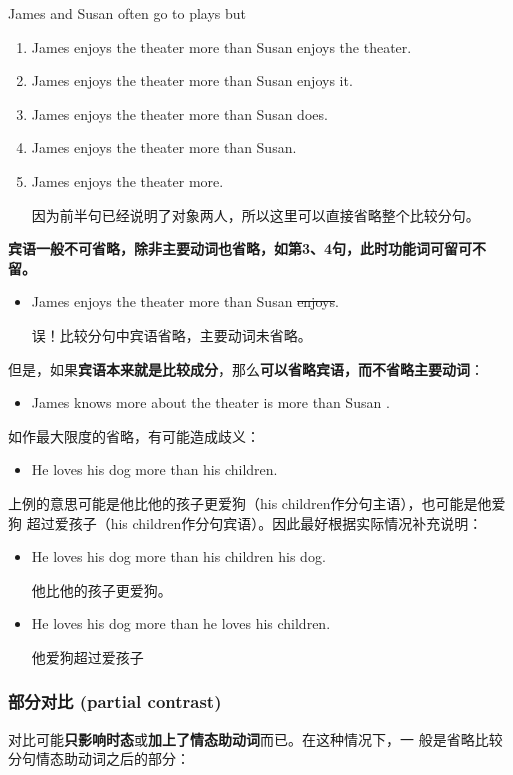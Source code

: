 James and Susan often go to plays but
\begin{enumerate}
\item James enjoys the theater more than Susan enjoys the theater.
\item James enjoys the theater more than Susan enjoys it.
\item James enjoys the theater more than Susan does.
\item James enjoys the theater more than Susan.
\item James enjoys the theater more.

  因为前半句已经说明了对象两人，所以这里可以直接省略整个比较分句。
\end{enumerate}
\textbf{宾语一般不可省略，除非主要动词也省略，如第3、4句，此时功能词可留可不留。}
\begin{itemize}
\item James enjoys the theater more than Susan \sout{enjoys}.

  误！比较分句中宾语省略，主要动词未省略。
\end{itemize}
但是，如果\textbf{宾语本来就是比较成分}，那么\textbf{可以省略宾语，而不省略主要动词}：
\begin{itemize}
\item James knows more about the theater is more than Susan .
\end{itemize}


如作最大限度的省略，有可能造成歧义：
\begin{itemize}
\item He loves his dog more than his children.
\end{itemize}
上例的意思可能是他比他的孩子更爱狗（his children作分句主语），也可能是他爱狗
超过爱孩子（his children作分句宾语）。因此最好根据实际情况补充说明：
\begin{itemize}
\item He loves his dog more than his children  his dog.

  他比他的孩子更爱狗。
\item He loves his dog more than he loves his children.

  他爱狗超过爱孩子
\end{itemize}


\subsubsection{部分对比 (partial contrast)}

对比可能\textbf{只影响时态}或\textbf{加上了情态助动词}而已。在这种情况下，一
般是省略比较分句情态助动词之后的部分：

